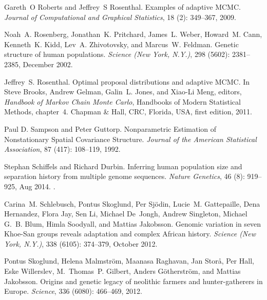 \documentclass[10pt,letterpaper]{article}
\begin{document}
\begin{thebibliography}{80}
Gareth~O Roberts and Jeffrey~S Rosenthal.
\newblock Examples of adaptive {MCMC}.
\newblock \emph{Journal of Computational and Graphical Statistics}, 18
  (2): 349--367, 2009.

Noah~A. Rosenberg, Jonathan~K. Pritchard, James~L. Weber, Howard~M. Cann,
  Kenneth~K. Kidd, Lev~A. Zhivotovsky, and Marcus~W. Feldman.
\newblock Genetic structure of human populations.
\newblock \emph{Science (New York, N.Y.)}, 298 (5602):
  2381--2385, December 2002.

Jeffrey~S. Rosenthal.
\newblock Optimal proposal distributions and adaptive {MCMC}.
\newblock In Steve Brooks, Andrew Gelman, Galin~L. Jones, and Xiao-Li Meng,
  editors, \emph{Handbook of {Markov} Chain {Monte} {Carlo}}, Handbooks of
  Modern Statistical Methods, chapter~4. Chapman \& Hall, CRC, Florida, USA,
  first edition, 2011.

Paul D.  Sampson  and  Peter  Guttorp.
\newblock Nonparametric Estimation of Nonstationary Spatial Covariance Structure.
\newblock \emph{Journal of the American Statistical Association}, 
87 (417): 108--119, 1992.

Stephan Schiffels  and Richard Durbin.
\newblock Inferring human population size and separation history from multiple genome sequences.
\newblock \emph{Nature Genetics}, 46 (8): 919--925, Aug 2014.
\newblock {}.

Carina~M. Schlebusch, Pontus Skoglund, Per Sjödin, Lucie~M. Gattepaille, Dena
  Hernandez, Flora Jay, Sen Li, Michael De~Jongh, Andrew Singleton, Michael
  G.~B. Blum, Himla Soodyall, and Mattias Jakobsson.
\newblock Genomic variation in seven {Khoe}-{San} groups reveals adaptation and
  complex {African} history.
\newblock \emph{Science (New York, N.Y.)}, 338 (6105):
  374--379, October 2012.

Pontus Skoglund, Helena Malmstr{\"o}m, Maanasa Raghavan, Jan Stor{\aa}, Per
  Hall, Eske Willerslev, M.~Thomas~P. Gilbert, Anders G{\"o}therstr{\"o}m, and
  Mattias Jakobsson.
\newblock Origins and genetic legacy of neolithic farmers and hunter-gatherers
  in {Europe}.
\newblock \emph{Science}, 336 (6080): 466--469, 2012.


\end{thebibliography}
\end{document}
